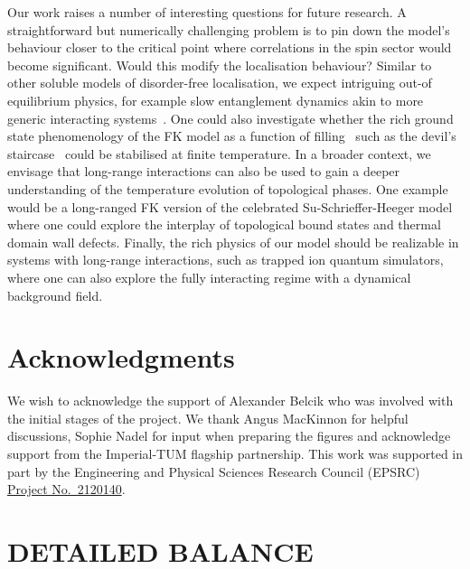 Our work raises a number of interesting questions for future research. A straightforward but numerically challenging problem is to pin down the model's behaviour closer to the critical point where correlations in the spin sector would become significant. Would this modify the localisation behaviour? Similar to other soluble models of disorder-free localisation, we expect intriguing out-of equilibrium physics, for example slow entanglement dynamics akin to more generic interacting systems~\autocite{hartLogarithmicEntanglementGrowth2020}. One could also investigate whether the rich ground state phenomenology of the FK model as a function of filling~\autocite{gruberGroundStatesSpinless1990} such as the devil's staircase~\autocite{michelettiCompleteDevilTextquotesingles1997} could be stabilised at finite temperature. In a broader context, we envisage that long-range interactions can also be used to gain a deeper understanding of the temperature evolution of topological phases. One example would be a long-ranged {FK} version of the celebrated Su-Schrieffer-Heeger model where one could explore the interplay of topological bound states and thermal domain wall defects. Finally, the rich physics of our model should be realizable in systems with long-range interactions, such as trapped ion quantum simulators, where one can also explore the fully interacting regime with a dynamical background field.

\hypertarget{acknowledgments}{%
\section{Acknowledgments}\label{acknowledgments}}

We wish to acknowledge the support of Alexander Belcik who was involved with the initial stages of the project. We thank Angus MacKinnon for helpful discussions, Sophie Nadel for input when preparing the figures and acknowledge support from the Imperial-TUM flagship partnership. This work was supported in part by the Engineering and Physical Sciences Research Council (EPSRC) \href{https://gtr.ukri.org/project/145404DD-ABAD-4CFB-A2D8-152A6AFCCEB7\#/tabOverview}{Project No.~2120140}.

\hypertarget{detailed-balance}{%
\section[ DETAILED BALANCE]{\texorpdfstring{\protect\hypertarget{app:balance}{}{} DETAILED BALANCE}{ DETAILED BALANCE}}\label{detailed-balance}}

